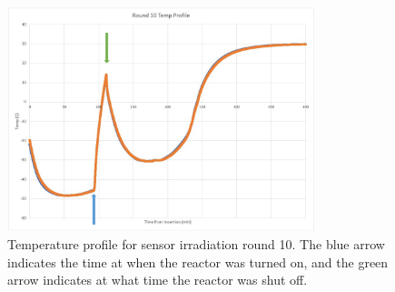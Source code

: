 \begin{figure}[!hbt]
  \begin{center}
    \includegraphics[width=0.80\textwidth]{figures/Round_10_Temperature_Profile}
    \caption{Temperature profile for sensor irradiation round 10. The blue arrow indicates the time at when the reactor was turned on, and the green arrow indicates at what time the reactor was shut off.}
    \label{fig:Round_10_Temperature_Profile}
  \end{center}
\end{figure}

\fi       %
